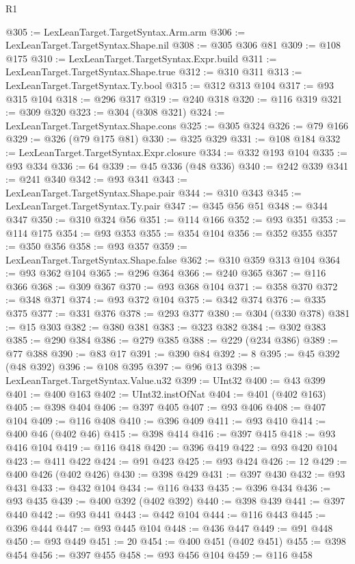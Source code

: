 \begin{lexlean}{R1}
\begin{coremodule}
@305 := LexLeanTarget.TargetSyntax.Arm.arm
@306 := LexLeanTarget.TargetSyntax.Shape.nil
@308 := @305 @306 @81
@309 := @108 @175
@310 := LexLeanTarget.TargetSyntax.Expr.build
@311 := LexLeanTarget.TargetSyntax.Shape.true
@312 := @310 @311
@313 := LexLeanTarget.TargetSyntax.Ty.bool
@315 := @312 @313 @104
@317 := @93 @315 @104
@318 := @296 @317
@319 := @240 @318
@320 := @116 @319
@321 := @309 @320
@323 := @304 (@308 @321)
@324 := LexLeanTarget.TargetSyntax.Shape.cons
@325 := @305 @324
@326 := @79 @166
@329 := @326 (@79 @175 @81)
@330 := @325 @329
@331 := @108 @184
@332 := LexLeanTarget.TargetSyntax.Expr.closure
@334 := @332 @193 @104
@335 := @93 @334
@336 := 64
@339 := @45 @336 (@48 @336)
@340 := @242 @339
@341 := @241 @340
@342 := @93 @341
@343 := LexLeanTarget.TargetSyntax.Shape.pair
@344 := @310 @343
@345 := LexLeanTarget.TargetSyntax.Ty.pair
@347 := @345 @56 @51
@348 := @344 @347
@350 := @310 @324 @56
@351 := @114 @166
@352 := @93 @351
@353 := @114 @175
@354 := @93 @353
@355 := @354 @104
@356 := @352 @355
@357 := @350 @356
@358 := @93 @357
@359 := LexLeanTarget.TargetSyntax.Shape.false
@362 := @310 @359 @313 @104
@364 := @93 @362 @104
@365 := @296 @364
@366 := @240 @365
@367 := @116 @366
@368 := @309 @367
@370 := @93 @368 @104
@371 := @358 @370
@372 := @348 @371
@374 := @93 @372 @104
@375 := @342 @374
@376 := @335 @375
@377 := @331 @376
@378 := @293 @377
@380 := @304 (@330 @378)
@381 := @15 @303
@382 := @380 @381
@383 := @323 @382
@384 := @302 @383
@385 := @290 @384
@386 := @279 @385
@388 := @229 (@234 @386)
@389 := @77 @388
@390 := @83 @17
@391 := @390 @84
@392 := 8
@395 := @45 @392 (@48 @392)
@396 := @108 @395
@397 := @96 @13
@398 := LexLeanTarget.TargetSyntax.Value.u32
@399 := UInt32
@400 := @43 @399
@401 := @400 @163
@402 := UInt32.instOfNat
@404 := @401 (@402 @163)
@405 := @398 @404
@406 := @397 @405
@407 := @93 @406
@408 := @407 @104
@409 := @116 @408
@410 := @396 @409
@411 := @93 @410
@414 := @400 @46 (@402 @46)
@415 := @398 @414
@416 := @397 @415
@418 := @93 @416 @104
@419 := @116 @418
@420 := @396 @419
@422 := @93 @420 @104
@423 := @411 @422
@424 := @91 @423
@425 := @93 @424
@426 := 12
@429 := @400 @426 (@402 @426)
@430 := @398 @429
@431 := @397 @430
@432 := @93 @431
@433 := @432 @104
@434 := @116 @433
@435 := @396 @434
@436 := @93 @435
@439 := @400 @392 (@402 @392)
@440 := @398 @439
@441 := @397 @440
@442 := @93 @441
@443 := @442 @104
@444 := @116 @443
@445 := @396 @444
@447 := @93 @445 @104
@448 := @436 @447
@449 := @91 @448
@450 := @93 @449
@451 := 20
@454 := @400 @451 (@402 @451)
@455 := @398 @454
@456 := @397 @455
@458 := @93 @456 @104
@459 := @116 @458

\end{coremodule}
\end{lexlean}
